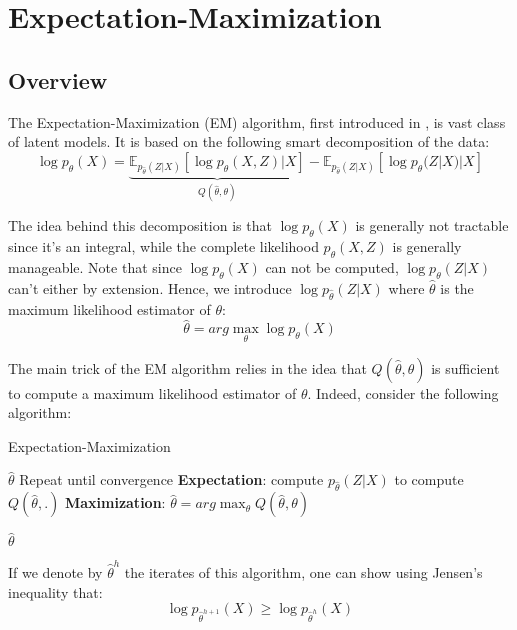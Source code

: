 \section{Expectation-Maximization}

\subsection{Overview}

The Expectation-Maximization (EM) algorithm, first introduced in \cite{expectation_maximization_source}, is vast class of latent models.
It is based on the following smart decomposition of the data:
$$
\log p_{\theta}(X) = \underbrace{\mathbb{E}_{p_{\widehat{\theta}}(Z|X)}[\log p_{\theta}(X,Z)|X]}_{Q(\widehat{\theta}, \theta)} - \mathbb{E}_{p_{\widehat{\theta}}(Z|X)}[\log p_{\theta}(Z|X)|X]
$$

The idea behind this decomposition is that $\log p_{\theta}(X)$ is generally not tractable since it's an integral, while the complete likelihood $p_{\theta}(X,Z)$ is generally manageable.
Note that since $\log p_{\theta}(X)$ can not be computed, $\log p_{\theta}(Z|X)$ can't either by extension.
Hence, we introduce $\log p_{\widehat{\theta}}(Z|X)$ where $\widehat{\theta}$ is the maximum likelihood estimator of $\theta$:
$$
\widehat{\theta} = arg\max_{\theta} \log p_{\theta}(X)
$$

The main trick of the EM algorithm relies in the idea that $Q(\widehat{\theta}, \theta)$ is sufficient to compute a maximum likelihood estimator of $\theta$.
Indeed, consider the following algorithm:
\begin{algorithm}[H]
    \caption{Expectation-Maximization}
    \begin{algorithmic}
        \REQUIRE $\widehat{\theta}$
        \STATE Repeat until convergence
            \STATE \quad \textbf{Expectation}: compute $p_{\widehat{\theta}}(Z|X)$ to compute $Q(\widehat{\theta}, .)$
            \STATE \quad \textbf{Maximization}: $\widehat{\theta} = arg\max_{\theta} Q(\widehat{\theta}, \theta)$

        \RETURN{} $\widehat{\theta}$
    \end{algorithmic}

    \label{alg:em_algo}
\end{algorithm}

If we denote by $\widehat{\theta}^h$ the iterates of this algorithm, one can show using Jensen's inequality that:
$$
\log p_{\widehat{\theta}^{h+1}}(X) \geq \log p_{\widehat{\theta}^h}(X)
$$

